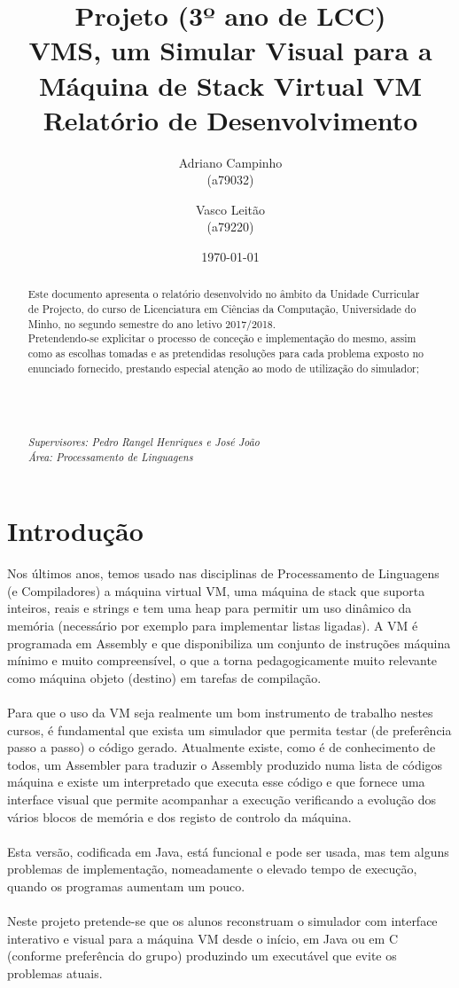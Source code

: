 \documentclass{report}
\title{Projeto (3º ano de LCC)\\ \textbf{VMS, um Simular Visual para a Máquina de Stack Virtual VM}\\ Relatório de Desenvolvimento}
\author{Adriano Campinho\\ (a79032) \and Vasco Leitão\\ (a79220) }
\date{\today}
\def\supers#1{{\em Supervisores: #1}\\ }
\def\area#1{{\em \'{A}rea: #1}\\[0.2cm]}
\begin{document}
\maketitle
\begin{abstract}
	\quad Este documento apresenta o relatório desenvolvido no âmbito da Unidade Curricular de Projecto, do curso de
	Licenciatura em Ciências da Computação, Universidade do Minho, no segundo semestre do ano letivo 2017/2018.\\
	\quad Pretendendo-se explicitar o processo de conceção e implementação do mesmo, assim como as escolhas tomadas e as pretendidas resoluções
	para cada problema exposto no enunciado fornecido, prestando especial atenção ao modo de utilização do simulador; \\
	\\
	\\
	\\
    \\
	\supers{Pedro Rangel Henriques e José João}
	\area{Processamento de Linguagens}

\end{abstract}

\tableofcontents

\chapter{Introdução} \label{intro}

\quad Nos últimos anos, temos usado nas disciplinas de Processamento de Linguagens (e
Compiladores) a máquina virtual VM, uma máquina de stack que suporta inteiros, reais e
strings e tem uma heap para permitir um uso dinâmico da memória (necessário por exemplo
para implementar listas ligadas). A VM é programada em Assembly e que disponibiliza um
conjunto de instruções máquina mínimo e muito compreensível, o que a torna
pedagogicamente muito relevante como máquina objeto (destino) em tarefas de compilação.
\\
\\
\null\quad Para que o uso da VM seja realmente um bom instrumento de trabalho nestes cursos, é
fundamental que exista um simulador que permita testar (de preferência passo a passo) o
código gerado. Atualmente existe, como é de conhecimento de todos, um Assembler para
traduzir o Assembly produzido numa lista de códigos máquina e existe um interpretado que
executa esse código e que fornece uma interface visual que permite acompanhar a execução
verificando a evolução dos vários blocos de memória e dos registo de controlo da máquina.
\\
\\
\null\quad Esta versão, codificada em Java, está funcional e pode ser usada, mas tem alguns problemas de
implementação, nomeadamente o elevado tempo de execução, quando os programas
aumentam um pouco.
\\
\\
\null\quad Neste projeto pretende-se que os alunos reconstruam o simulador com interface interativo e
visual para a máquina VM desde o início, em Java ou em C (conforme preferência do grupo)
produzindo um executável que evite os problemas atuais.
\end{document}
